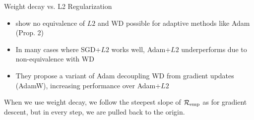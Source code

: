 \documentclass[11pt,compress,t,notes=noshow, xcolor=table]{beamer}
\begin{document}
\begin{vbframe}{Weight decay vs. L2 Regularization}
\begin{itemize}
    \item {} show no equivalence of $L2$ and WD possible for adaptive methods like Adam (Prop. 2)
    \item In many cases where SGD+$L2$ works well, Adam+$L2$ underperforms due to non-equivalence with WD
    \item They propose a variant of Adam decoupling WD from gradient updates (AdamW), increasing performance over Adam+$L2$
\end{itemize}



\framebreak

When we use weight decay, we follow the steepest slope of $\mathcal{R}_{\text{emp}}$ as for gradient descent, but in every step, we are pulled back to the origin.
\begin{figure}
  \\
  \caption*{}
\end{figure}



\end{vbframe}
\end{document}
